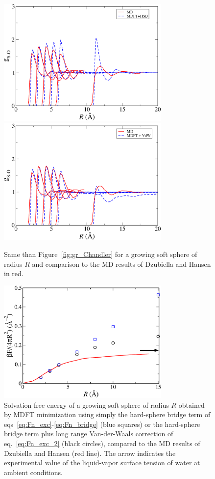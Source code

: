 \documentclass[aip,jcp,showpacs,amsmath,amssymb,superscriptaddress]{revtex4-1}
\begin{document}
\begin{figure}
    \includegraphics[width=8.5cm]{gHANSEN_HSB_SPC.pdf}\\
    \includegraphics[width=8.5cm]{gHANSEN_VdW_a12p3_m0p9_SPC.pdf}
    \caption{
        \label{fig:gr_Hansen}
        Same than Figure~\ref{fig:gr_Chandler} for a growing soft sphere of radius $R$ and comparison to the MD results of Dzubiella and Hansen\cite{dzubiella04} in red.         }
\end{figure}

\begin{figure}
    \includegraphics[width=8.5cm]{ener_systemChandler_VdW_MD_SPC.pdf}
    \caption{
        \label{fig:free_energy_Hansen}
        Solvation free energy of a  growing soft sphere of radius $R$ obtained by MDFT minimization using simply the hard-sphere bridge term of eqs~\ref{eq:Fn_exc}-\ref{eq:Fn_bridge} (blue squares) or the hard-sphere bridge term plus long range Van-der-Waals correction of eq.~\ref{eq:Fn_exc_2} (black circles), compared to the MD results of Dzubiella and Hansen\cite{dzubiella04} (red line). The arrow
        indicates the experimental value of the liquid-vapor surface tension of water at ambient conditions\cite{Lemmon}.        }
\end{figure}
\end{document}
